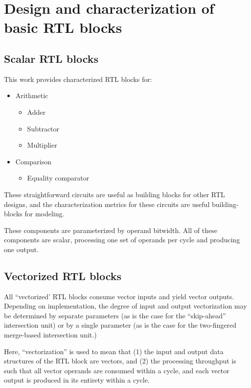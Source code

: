 \chapter{Design and characterization of basic RTL blocks}

\section{Scalar RTL blocks}

This work provides characterized RTL blocks for:

\begin{itemize}
    \item Arithmetic

    \begin{itemize}
        \item Adder
        \item Subtractor
        \item Multiplier
    \end{itemize}
    
    \item Comparison

    \begin{itemize}
        \item Equality comparator
    \end{itemize}
\end{itemize}

These straightforward circuits are useful as building blocks for other RTL designs, and the characterization metrics for these circuits are useful building-blocks for modeling.

These components are parameterized by operand bitwidth. All of these components are scalar, processing one set of operands per cycle and producing one output.

\section{Vectorized RTL blocks}

All ``vectorized' RTL blocks consume vector inputs and yield vector outputs. Depending on implementation, the degree of input and output vectorization may be determined by separate parameters (as is the case for the ``skip-ahead'' intersection unit) or by a single parameter (as is the case for the two-fingered merge-based intersection unit.)

Here, ``vectorization'' is used to mean that (1) the input and output data structures of the RTL block are vectors, and (2) the processing throughput is such that all vector operands are consumed within a cycle, and each vector output is produced in its entirety within a cycle.

